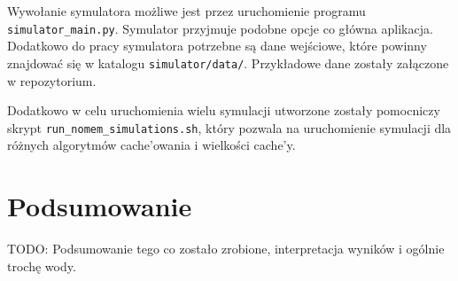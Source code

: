\documentclass[a4paper,11pt]{scrartcl}
\newcommand{\f}{\texttt}
\newcommand{\s}{ }
\newcommand{\keszy}{cache'y}
\newcommand{\keszowania}{cache'owania}
\begin{document}
Wywołanie symulatora możliwe jest przez uruchomienie programu \f{simulator\_main.py}. Symulator przyjmuje podobne opcje co główna aplikacja. Dodatkowo do pracy symulatora potrzebne są dane wejściowe, które powinny znajdować się w katalogu \f{simulator/data/}. Przykładowe dane zostały załączone w repozytorium.

Dodatkowo w celu uruchomienia wielu symulacji utworzone zostały pomocniczy skrypt \f{run\_nomem\_simulations.sh}, który pozwala na uruchomienie symulacji dla różnych algorytmów \keszowania\s i wielkości \keszy.


\section{Podsumowanie}

TODO: Podsumowanie tego co zostało zrobione, interpretacja wyników i ogólnie trochę wody.




\end{document}

